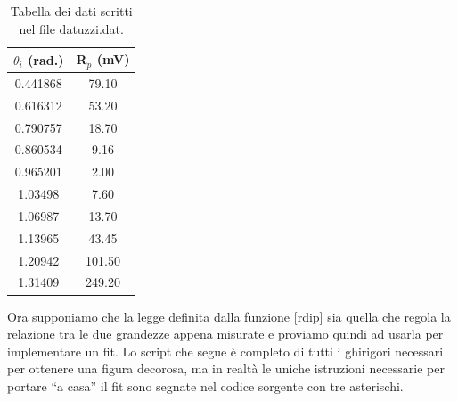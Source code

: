 \documentclass[11pt,fleqn]{book} %
\begin{document}
\begin{table}[h]
\centering
\caption{Tabella dei dati scritti nel file datuzzi.dat.\label{datuzzi}}
\vspace{0.2cm}
\begin{tabular}{c|c}
$\theta_i$ (rad.) & R$_p$ (mV)\\
\hline
0.441868 & 79.10\\
\hline
0.616312 & 53.20\\
\hline
0.790757 & 18.70\\
\hline
0.860534 & 9.16\\
\hline
0.965201 & 2.00\\
\hline
1.03498 & 7.60\\
\hline
1.06987 & 13.70\\
\hline
1.13965 & 43.45\\
\hline
1.20942 & 101.50\\
\hline
1.31409 & 249.20
\end{tabular}
\end{table}

Ora supponiamo che la legge definita dalla funzione \ref{rdip} sia quella che regola la relazione tra le due grandezze appena misurate e proviamo quindi ad usarla per implementare un fit. Lo script che segue è completo di tutti i ghirigori necessari per ottenere una figura decorosa, ma in realtà le uniche istruzioni necessarie per portare ``a casa'' il fit sono segnate nel codice sorgente con tre asterischi.
\end{document}

